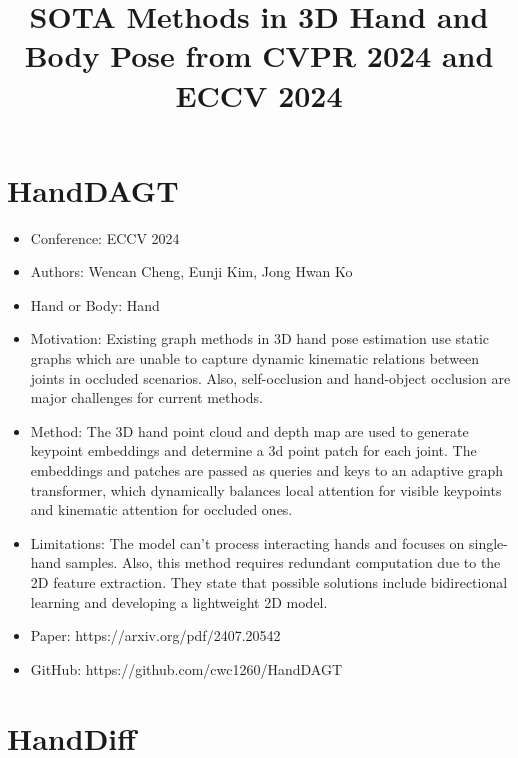 \documentclass{article}
\title{SOTA Methods in 3D Hand and Body Pose from CVPR 2024 and ECCV 2024}
\author{}
\date{}
\begin{document}
\maketitle

\section*{HandDAGT}

\begin{itemize}
    \item Conference: ECCV 2024
    \item Authors: Wencan Cheng, Eunji Kim, Jong Hwan Ko
    \item Hand or Body: Hand
    \item Motivation: Existing graph methods in 3D hand pose estimation use static graphs which are unable to capture dynamic kinematic relations between joints in occluded scenarios. Also, self-occlusion and hand-object occlusion are major challenges for current methods.
    \item Method: The 3D hand point cloud and depth map are used to generate keypoint embeddings and determine a 3d point patch for each joint. The embeddings and patches are passed as queries and keys to an adaptive graph transformer, which dynamically balances local attention for visible keypoints and kinematic attention for occluded ones.
    \item Limitations: The model can't process interacting hands and focuses on single-hand samples. Also, this method requires redundant computation due to the 2D feature extraction. They state that possible solutions include bidirectional learning and developing a lightweight 2D model.
    \item Paper: https://arxiv.org/pdf/2407.20542
    \item GitHub: https://github.com/cwc1260/HandDAGT
\end{itemize}

\section*{HandDiff}
\end{document}
